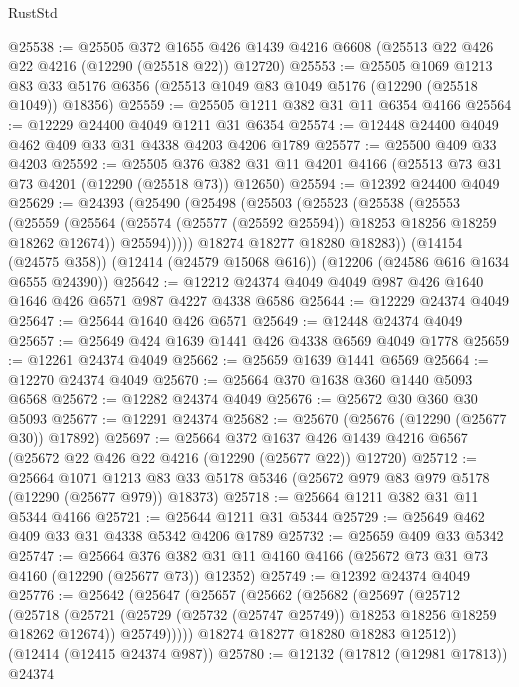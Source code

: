 \begin{lexlean}{RustStd}
\begin{coremodule}
{\begin{coremodule}
{{{{{{{{{{{{{{{{{{{{{{{{{{{{{{{{{{{{{{{{{{{{{{{{{{@25538 := @25505
    @372
    @1655
    @426
    @1439
    @4216
    @6608
    (@25513 @22 @426 @22 @4216 (@12290 (@25518 @22)) @12720)
@25553 := @25505
    @1069
    @1213
    @83
    @33
    @5176
    @6356
    (@25513 @1049 @83 @1049 @5176 (@12290 (@25518 @1049)) @18356)
@25559 := @25505 @1211 @382 @31 @11 @6354 @4166
@25564 := @12229 @24400 @4049 @1211 @31 @6354
@25574 := @12448 @24400 @4049 @462 @409 @33 @31 @4338 @4203 @4206 @1789
@25577 := @25500 @409 @33 @4203
@25592 := @25505
    @376
    @382
    @31
    @11
    @4201
    @4166
    (@25513 @73 @31 @73 @4201 (@12290 (@25518 @73)) @12650)
@25594 := @12392 @24400 @4049
@25629 := @24393
    (@25490
      (@25498
        (@25503
          (@25523
            (@25538
              (@25553
                (@25559
                  (@25564 (@25574 (@25577 (@25592 @25594)) @18253 @18256 @18259 @18262 @12674))
                  @25594)))))
        @18274
        @18277
        @18280
        @18283))
    (@14154 (@24575 @358))
    (@12414 (@24579 @15068 @616))
    (@12206 (@24586 @616 @1634 @6555 @24390))
@25642 := @12212 @24374 @4049 @4049 @987 @426 @1640 @1646 @426 @6571 @987 @4227 @4338 @6586
@25644 := @12229 @24374 @4049
@25647 := @25644 @1640 @426 @6571
@25649 := @12448 @24374 @4049
@25657 := @25649 @424 @1639 @1441 @426 @4338 @6569 @4049 @1778
@25659 := @12261 @24374 @4049
@25662 := @25659 @1639 @1441 @6569
@25664 := @12270 @24374 @4049
@25670 := @25664 @370 @1638 @360 @1440 @5093 @6568
@25672 := @12282 @24374 @4049
@25676 := @25672 @30 @360 @30 @5093
@25677 := @12291 @24374
@25682 := @25670 (@25676 (@12290 (@25677 @30)) @17892)
@25697 := @25664
    @372
    @1637
    @426
    @1439
    @4216
    @6567
    (@25672 @22 @426 @22 @4216 (@12290 (@25677 @22)) @12720)
@25712 := @25664
    @1071
    @1213
    @83
    @33
    @5178
    @5346
    (@25672 @979 @83 @979 @5178 (@12290 (@25677 @979)) @18373)
@25718 := @25664 @1211 @382 @31 @11 @5344 @4166
@25721 := @25644 @1211 @31 @5344
@25729 := @25649 @462 @409 @33 @31 @4338 @5342 @4206 @1789
@25732 := @25659 @409 @33 @5342
@25747 := @25664
    @376
    @382
    @31
    @11
    @4160
    @4166
    (@25672 @73 @31 @73 @4160 (@12290 (@25677 @73)) @12352)
@25749 := @12392 @24374 @4049
@25776 := @25642
    (@25647
      (@25657
        (@25662
          (@25682
            (@25697
              (@25712
                (@25718
                  (@25721 (@25729 (@25732 (@25747 @25749)) @18253 @18256 @18259 @18262 @12674))
                  @25749)))))
        @18274
        @18277
        @18280
        @18283
        @12512))
    (@12414 (@12415 @24374 @987))
@25780 := @12132 (@17812 (@12981 @17813)) @24374
}}}}}}}}}}}}}}}}}}}}}}}}}}}}}}}}}}}}}}}}}}}}}}}}}}
\end{coremodule}}
\end{coremodule}
\end{lexlean}
